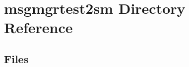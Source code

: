 \section{msgmgrtest2sm Directory Reference}
\label{dir_81a166d4e5c262fdaef6e03217eee581}
\subsection*{Files}
\begin{DoxyCompactItemize}
\end{DoxyCompactItemize}
